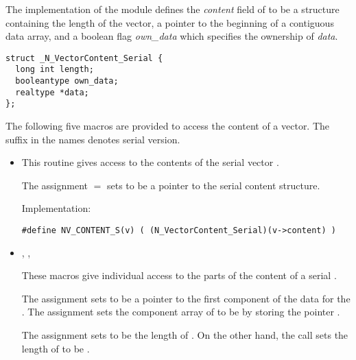 
The {\nvecs} implementation of the {\nvector} module defines the {\em content} 
field of  to be a structure containing the length of the vector,
a pointer to the beginning of a contiguous data array, and a boolean flag
{\em own\_data} which specifies the ownership of {\em data}.
\begin{verbatim} 
struct _N_VectorContent_Serial {
  long int length;
  booleantype own_data;
  realtype *data;
};
\end{verbatim}
The following five macros are provided to access the content of a {\nvecs}
vector. The suffix  in the names denotes serial version.
\begin{itemize}

\item {}                             
    
  This routine gives access to the contents of the serial
  vector .
  
  The assignment  $=$  sets           
   to be a pointer to the serial  content  
  structure.                                             
                                                            
  Implementation: 
  
  \verb|#define NV_CONTENT_S(v) ( (N_VectorContent_Serial)(v->content) )|
  
\item {}, ,                                  
                                                            
  These macros give individual access to the parts of    
  the content of a serial .                        
                                                               
  The assignment  sets  to be     
  a pointer to the first component of the data for the  . 
  The assignment  sets the component array of  to     
  be  by storing the pointer .                   
  
  The assignment  sets  to be     
  the length of . On the other hand, the call  
  sets the length of  to be .
                                                            

\end{itemize}
